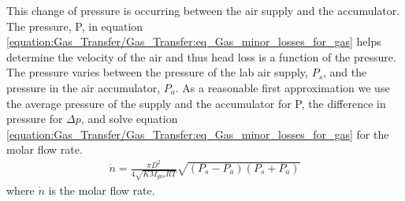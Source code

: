 \documentclass[letterpaper,10pt,english]{sphinxmanual}
\begin{document}
This change of pressure is occurring between the air supply and the accumulator. The pressure, P, in equation \eqref{equation:Gas_Transfer/Gas_Transfer:eq_Gas_minor_losses_for_gas} helps determine the velocity of the air and thus head loss is a function of the pressure. The pressure varies between the pressure of the lab air supply, \(P_s\), and the pressure in the air accumulator, \(P_a\). As a reasonable first approximation we use the average pressure of the supply and the accumulator for P, the difference in pressure for \(\Delta p\), and solve equation \eqref{equation:Gas_Transfer/Gas_Transfer:eq_Gas_minor_losses_for_gas} for the molar flow rate.
\begin{equation}\label{equation:Gas_Transfer/Gas_Transfer:eq_Gas_molar_flow_of_air}
\begin{split} \dot{n}=\frac{\pi D^{2} }{4\sqrt{KM_{gas} RT} } \sqrt{\left(P_{s} -P_{a} \right)\left(P_{s} +P_{a} \right)}\end{split}
\end{equation}
where \(\dot{n}\) is the molar flow rate.
\end{document}

